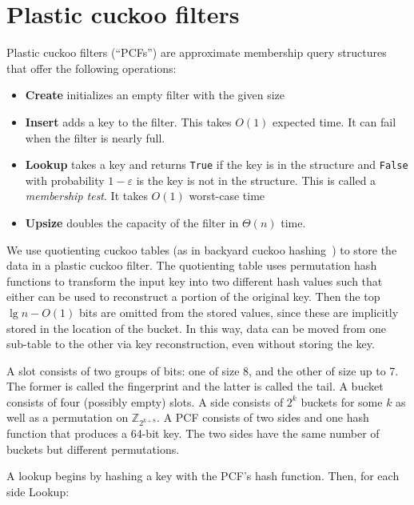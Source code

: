 \documentclass[letterpaper, 11pt]{article}
\newcommand{\ints}{\mathbb{Z}}
\begin{document}
\section{Plastic cuckoo filters}

Plastic cuckoo filters (``PCFs'') are approximate membership query structures that offer the following operations:

\begin{itemize}
\item {\bf Create} initializes an empty filter with the given size
\item {\bf Insert} adds a key to the filter.
  This takes $O(1)$ expected time.
  It can fail when the filter is nearly full.
\item {\bf Lookup} takes a key and returns \verb|True| if the key is in the structure and \verb|False| with probability $1-\varepsilon$ is the key is not in the structure.
  This is called a {\em membership test}.
  It takes $O(1)$ worst-case time
\item {\bf Upsize} doubles the capacity of the filter in $\Theta(n)$ time.
\end{itemize}

We use quotienting cuckoo tables (as in backyard cuckoo hashing~\cite{backyard}) to store the data in a plastic cuckoo filter.
The quotienting table uses permutation hash functions to transform the input key into two different hash values such that either can be used to reconstruct a portion of the original key.
Then the top $\lg n - O(1)$ bits are omitted from the stored values, since these are implicitly stored in the location of the bucket.
In this way, data can be moved from one sub-table to the other via key reconstruction, even without storing the key.

A slot consists of two groups of bits: one of size 8, and the other of size up to 7.
The former is called the fingerprint and the latter is called the tail.
A bucket consists of four (possibly empty) slots.
A side consists of $2^k$ buckets for some $k$ as well as a permutation on $\ints_{2^{k+8}}$.
A PCF consists of two sides and one hash function that produces a 64-bit key.
The two sides have the same number of buckets but different permutations.

A lookup begins by hashing a key with the PCF's hash function.
Then, for each side Lookup:
\end{document}
